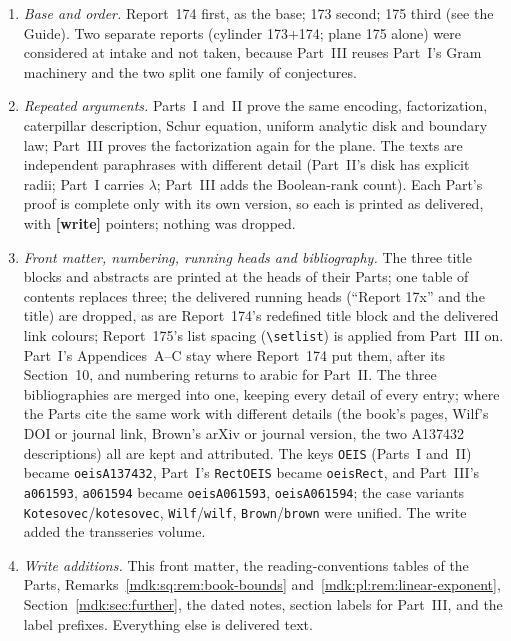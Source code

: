 \documentclass[11pt,letterpaper]{article}
\numberwithin{equation}{section}
\theoremstyle{remark}\newtheorem{remark}[theorem]{Remark}
\begin{document}
\begin{enumerate}
\item \emph{Base and order.} Report~174 first, as the base; 173 second; 175 third (see the Guide). Two separate reports (cylinder 173+174; plane 175 alone) were considered at intake and not taken, because Part~III reuses Part~I's Gram machinery and the two split one family of conjectures.
\item \emph{Repeated arguments.} Parts~I and~II prove the same encoding, factorization, caterpillar description, Schur equation, uniform analytic disk and boundary law; Part~III proves the factorization again for the plane. The texts are independent paraphrases with different detail (Part~II's disk has explicit radii; Part~I carries $\lambda$; Part~III adds the Boolean-rank count). Each Part's proof is complete only with its own version, so each is printed as delivered, with \textbf{[write]} pointers; nothing was dropped.
\item \emph{Front matter, numbering, running heads and bibliography.} The three title blocks and abstracts are printed at the heads of their Parts; one table of contents replaces three; the delivered running heads (``Report 17x'' and the title) are dropped, as are Report~174's redefined title block and the delivered link colours; Report~175's list spacing (\verb|\setlist|) is applied from Part~III on. Part~I's Appendices~A--C stay where Report~174 put them, after its Section~10, and numbering returns to arabic for Part~II. The three bibliographies are merged into one, keeping every detail of every entry; where the Parts cite the same work with different details (the book's pages, Wilf's DOI or journal link, Brown's arXiv or journal version, the two A137432 descriptions) all are kept and attributed. The keys \texttt{OEIS} (Parts~I and~II) became \texttt{oeisA137432}, Part~I's \texttt{RectOEIS} became \texttt{oeisRect}, and Part~III's \texttt{a061593}, \texttt{a061594} became \texttt{oeisA061593}, \texttt{oeisA061594}; the case variants \texttt{Kotesovec}/\texttt{kotesovec}, \texttt{Wilf}/\texttt{wilf}, \texttt{Brown}/\texttt{brown} were unified. The write added the transseries volume.
\item \emph{Write additions.} This front matter, the reading-conventions tables of the Parts, Remarks~\ref{mdk:sq:rem:book-bounds} and~\ref{mdk:pl:rem:linear-exponent}, Section~\ref{mdk:sec:further}, the dated notes, section labels for Part~III, and the label prefixes. Everything else is delivered text.
\end{enumerate}
\end{document}
